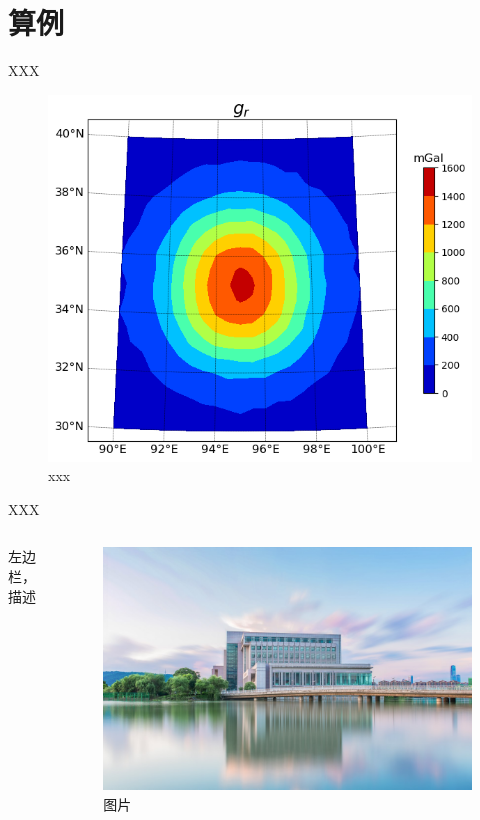 \documentclass[xcolor=svgnames]{beamer}
\begin{document}
\section{算例}
\begin{frame}{XXX}
\begin{figure}
	\centering
	\includegraphics[width=0.65\linewidth]{figures/gr}
	\caption{xxx}
	\label{fig:gr}
\end{figure}
\end{frame}
\begin{frame}{XXX}
\begin{columns}
	\begin{column}{0.4\textwidth}
		左边栏，描述
	\end{column}
	\begin{column}{0.55\textwidth}
		\begin{figure}
			\includegraphics[width=\linewidth]{bg.png}
			\caption{图片}
		\end{figure}
	\end{column}
\end{columns}
\end{frame}
\end{document}
